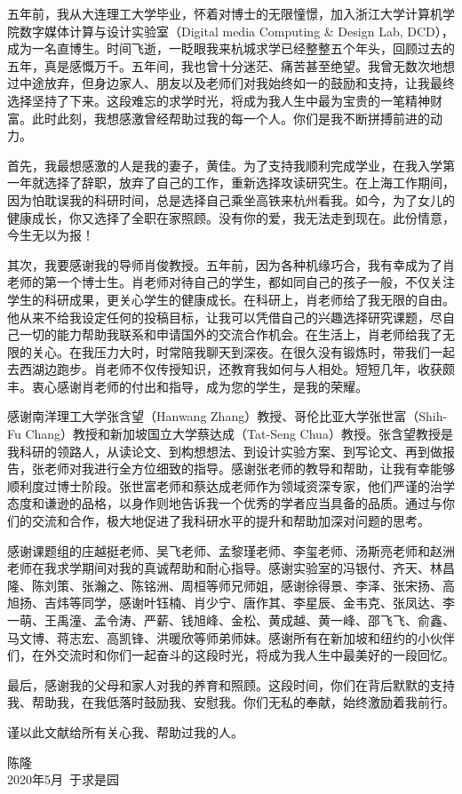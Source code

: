 \begin{thanks}

五年前，我从大连理工大学毕业，怀着对博士的无限憧憬，加入浙江大学计算机学院数字媒体计算与设计实验室（Digital media Computing \& Design Lab, DCD），成为一名直博生。时间飞逝，一眨眼我来杭城求学已经整整五个年头，回顾过去的五年，真是感慨万千。五年间，我也曾十分迷茫、痛苦甚至绝望。我曾无数次地想过中途放弃，但身边家人、朋友以及老师们对我始终如一的鼓励和支持，让我最终选择坚持了下来。这段难忘的求学时光，将成为我人生中最为宝贵的一笔精神财富。此时此刻，我想感激曾经帮助过我的每一个人。你们是我不断拼搏前进的动力。

首先，我最想感激的人是我的妻子，黄佳。为了支持我顺利完成学业，在我入学第一年就选择了辞职，放弃了自己的工作，重新选择攻读研究生。在上海工作期间，因为怕耽误我的科研时间，总是选择自己乘坐高铁来杭州看我。如今，为了女儿的健康成长，你又选择了全职在家照顾。没有你的爱，我无法走到现在。此份情意，今生无以为报！

其次，我要感谢我的导师肖俊教授。五年前，因为各种机缘巧合，我有幸成为了肖老师的第一个博士生。肖老师对待自己的学生，都如同自己的孩子一般，不仅关注学生的科研成果，更关心学生的健康成长。在科研上，肖老师给了我无限的自由。他从来不给我设定任何的投稿目标，让我可以凭借自己的兴趣选择研究课题，尽自己一切的能力帮助我联系和申请国外的交流合作机会。在生活上，肖老师给我了无限的关心。在我压力大时，时常陪我聊天到深夜。在很久没有锻炼时，带我们一起去西湖边跑步。肖老师不仅传授知识，还教育我如何与人相处。短短几年，收获颇丰。衷心感谢肖老师的付出和指导，成为您的学生，是我的荣耀。

感谢南洋理工大学张含望（Hanwang Zhang）教授、哥伦比亚大学张世富（Shih-Fu Chang）教授和新加坡国立大学蔡达成（Tat-Seng Chua）教授。张含望教授是我科研的领路人，从读论文、到构想想法、到设计实验方案、到写论文、再到做报告，张老师对我进行全方位细致的指导。感谢张老师的教导和帮助，让我有幸能够顺利度过博士阶段。张世富老师和蔡达成老师作为领域资深专家，他们严谨的治学态度和谦逊的品格，以身作则地告诉我一个优秀的学者应当具备的品质。通过与你们的交流和合作，极大地促进了我科研水平的提升和帮助加深对问题的思考。

感谢课题组的庄越挺老师、吴飞老师、孟黎瑾老师、李玺老师、汤斯亮老师和赵洲老师在我求学期间对我的真诚帮助和耐心指导。感谢实验室的冯银付、齐天、林昌隆、陈刘策、张瀚之、陈铭洲、周桓等师兄师姐，感谢徐得景、李泽、张宋扬、高旭扬、吉炜等同学，感谢叶钰楠、肖少宁、唐作其、李星辰、金韦克、张凤达、李一萌、王禹潼、孟令涛、严薪、钱旭峰、金松、黄成越、黄一峰、邵飞飞、俞鑫、马文博、蒋志宏、高凯锋、洪暖欣等师弟师妹。感谢所有在新加坡和纽约的小伙伴们，在外交流时和你们一起奋斗的这段时光，将成为我人生中最美好的一段回忆。

最后，感谢我的父母和家人对我的养育和照顾。这段时间，你们在背后默默的支持我、帮助我，在我低落时鼓励我、安慰我。你们无私的奉献，始终激励着我前行。

谨以此文献给所有关心我、帮助过我的人。

\begin{flushright}
	\begin{minipage}{12em}
	\begin{center}
		陈隆
		\\ 2020年5月\ 于求是园
	\end{center}
	\end{minipage}
\end{flushright}

\end{thanks}
